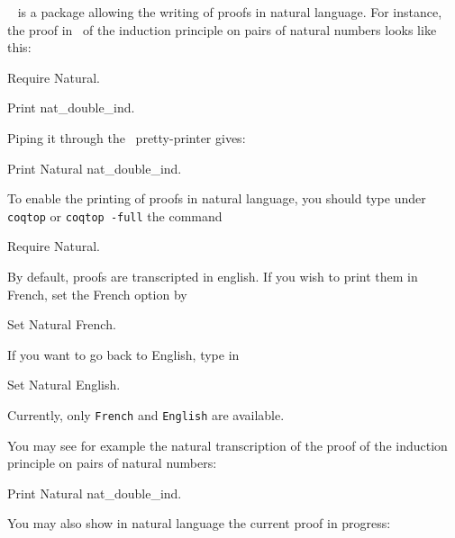 

\Natural~ is a package allowing the writing of proofs in natural
language. For instance, the proof in \Coq~of the induction principle on pairs
of natural numbers looks like this:

\begin{coq_example*}
Require Natural.
\end{coq_example*}
\begin{coq_example}
Print nat_double_ind.
\end{coq_example}

Piping it through the \Natural~pretty-printer gives:

\begin{coq_example}
Print Natural nat_double_ind.
\end{coq_example}


To enable the printing of proofs in natural language, you should
type under \texttt{coqtop} or \texttt{coqtop -full} the command

\begin{coq_example*}
Require Natural.
\end{coq_example*}

By default, proofs are transcripted in english. If you wish to print them 
in French, set the French option by

\begin{coq_example*}
Set Natural French.
\end{coq_example*}

If you want to go back to English, type in

\begin{coq_example*}
Set Natural English.
\end{coq_example*}

Currently, only \verb=French= and \verb=English= are available.

You may see for example the natural transcription of the proof of
the induction principle on pairs of natural numbers:

\begin{coq_example*}
Print Natural nat_double_ind.
\end{coq_example*}

You may  also show in natural language the current proof in progress:

